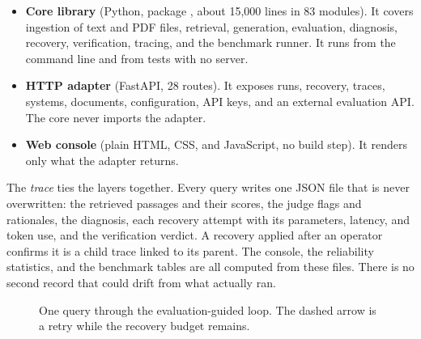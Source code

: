 \documentclass[12pt, a4paper, oneside]{report}
\newcommand{\code}[1]{\texttt{\detokenize{#1}}}
\begin{document}
\begin{itemize}
\item \textbf{Core library} (Python, package \code{swrag}, about 15{,}000
  lines in 83 modules). It covers ingestion of text and PDF files, retrieval,
  generation, evaluation, diagnosis, recovery, verification, tracing, and the
  benchmark runner. It runs from the command line and from tests with no
  server.
\item \textbf{HTTP adapter} (FastAPI, 28 routes). It exposes runs, recovery,
  traces, systems, documents, configuration, API keys, and an external
  evaluation API. The core never imports the adapter.
\item \textbf{Web console} (plain HTML, CSS, and JavaScript, no build step).
  It renders only what the adapter returns.
\end{itemize}

The \emph{trace} ties the layers together. Every query writes one JSON file
that is never overwritten: the retrieved passages and their scores, the
judge flags and rationales, the diagnosis, each recovery attempt with its
parameters, latency, and token use, and the verification verdict. A
recovery applied after an operator confirms it is a child trace linked to
its parent. The console, the reliability statistics, and the benchmark
tables are all computed from these files. There is no second record that
could drift from what actually ran.

\begin{figure}[htbp]
\centering
{}
\caption{One query through the evaluation-guided loop. The dashed arrow is
a retry while the recovery budget remains.}
\label{fig:loop}
\end{figure}
\end{document}

